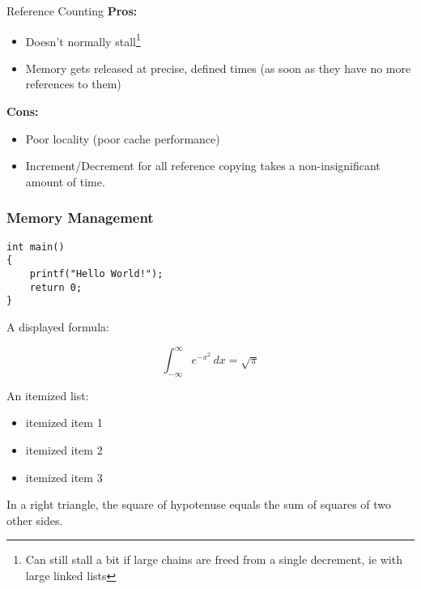 \documentclass{beamer}
\begin{document}
\begin{frame}{Reference Counting}
	\textbf{Pros:}
	\begin{itemize}
		\item Doesn't normally stall\footnote{Can still stall a bit if large chains are freed from a single decrement, ie with large linked lists}
		\item Memory gets released at precise, defined times (as soon as they have no more references to them)
	\end{itemize}
	\textbf{Cons:}
	\begin{itemize}
		\item Poor locality (poor cache performance)
		\item Increment/Decrement for all reference copying takes a non-insignificant amount of time.
	\end{itemize}
\end{frame}

\begin{frame}[fragile]
\frametitle{Memory Management}


\begin{lstlisting}[caption=First C example]
int main()
{
    printf("Hello World!");
    return 0;
}
\end{lstlisting}

A displayed formula:

\[
  \int_{-\infty}^\infty e^{-x^2} \, dx = \sqrt{\pi}
\]

An itemized list:

\begin{itemize}
  \item itemized item 1
  \item itemized item 2
  \item itemized item 3
\end{itemize}

\begin{theorem}
  In a right triangle, the square of hypotenuse equals
  the sum of squares of two other sides.
\end{theorem}

\end{frame}
\end{document}
